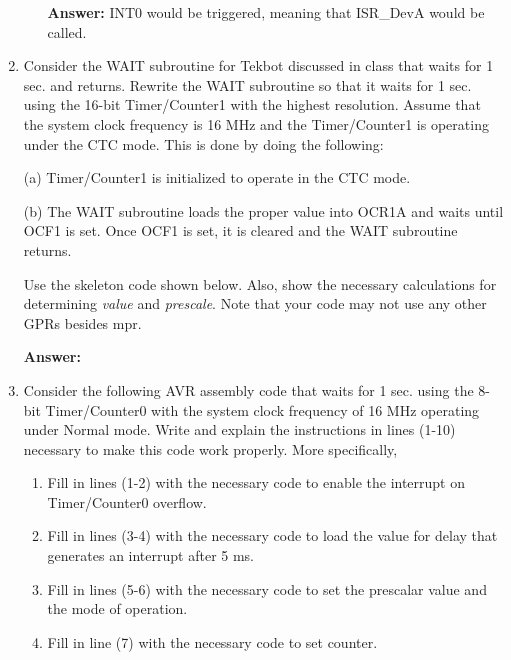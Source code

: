 \documentclass[12pt,letterpaper]{article}
\begin{document}
\begin{enumerate}
\begin{enumerate}[a]
			\textbf{Answer:} INT0 would be triggered, meaning that ISR\_DevA would be called.
			
		\end{enumerate}

	   
	   
	  
	
		\clearpage
	   \item
	 	Consider the WAIT subroutine for Tekbot discussed in class that waits for 1 sec. and returns. 
	 	Rewrite the WAIT subroutine so that it waits for 1 sec. using the 16-bit Timer/Counter1 with the highest resolution.
	 	Assume that the system clock frequency is 16 MHz and the Timer/Counter1 is operating under the CTC
	 	mode. 
	 	This is done by doing the following: 
	 	
	 	(a) Timer/Counter1 is initialized to operate in the CTC mode.
	 	
	 	(b) The WAIT subroutine loads the proper value into OCR1A and waits until OCF1 is set. Once OCF1 is set, it is cleared and the WAIT subroutine returns.
	 	
	 	Use the skeleton code shown below. Also, show the necessary calculations for determining \textit{value} and \textit{prescale}. 
	 	Note that your code may not use any other GPRs besides mpr.
	 	
	 	
		\textbf{Answer:}
		
		
		
		\clearpage
		\item
		Consider the following AVR assembly code that waits for 1 sec. using the 8-bit Timer/Counter0 with the system clock frequency of 16 MHz operating under Normal mode. Write and explain the instructions in lines (1-10) necessary to make this code work properly. 
		More specifically, 
		\begin{enumerate}[a]
			\item 
			Fill in lines (1-2) with the necessary code to enable the interrupt on Timer/Counter0 overflow.
			
			\item
			Fill in lines (3-4) with the necessary code to load the value for delay that generates an interrupt after 5
			ms.
			
			\item 
			Fill in lines (5-6) with the necessary code to set the prescalar value and the mode of operation.
			
			\item 
			Fill in line (7) with the necessary code to set counter.
			

\end{enumerate}
\end{enumerate}
\end{document}

